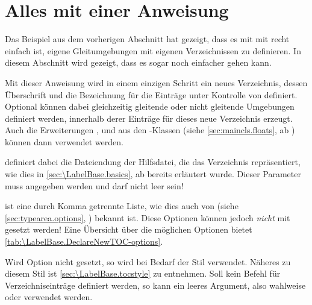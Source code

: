 \section{Alles mit einer Anweisung}

Das Beispiel aus dem vorherigen Abschnitt hat gezeigt, dass es mit mit
 recht einfach ist, eigene Gleitumgebungen mit eigenen
Verzeichnissen zu definieren. In diesem Abschnitt wird gezeigt, dass es sogar
noch einfacher gehen kann.

\begin{Declaration}
\end{Declaration}%
Mit dieser Anweisung wird in einem
einzigen Schritt ein neues Verzeichnis, dessen Überschrift und die Bezeichnung
für die Einträge unter Kontrolle von  definiert. Optional
können dabei gleichzeitig gleitende oder nicht gleitende Umgebungen definiert
werden, innerhalb derer %
 Einträge für
dieses neue Verzeichnis erzeugt. Auch die Erweiterungen
,  und
 aus den \KOMAScript-Klassen (siehe
\autoref{sec:maincls.floats}, ab )
können dann verwendet werden.

 definiert dabei die Dateiendung der Hilfsdatei, die
das Verzeichnis repräsentiert, wie dies in \autoref{sec:\LabelBase.basics}, ab
 bereits erläutert
wurde. Dieser Parameter muss angegeben werden und darf
nicht leer sein!

 ist eine durch Komma getrennte Liste, wie dies auch von
 (siehe \autoref{sec:typearea.options},
) bekannt ist. Diese
Optionen können jedoch \emph{nicht} mit
 gesetzt werden! Eine
Übersicht über die möglichen Optionen bietet
\autoref{tab:\LabelBase.DeclareNewTOC-options}.

Wird Option
 nicht gesetzt, so wird bei Bedarf der Stil
 verwendet. Näheres zu diesem Stil ist
\autoref{sec:\LabelBase.tocstyle} zu entnehmen. Soll kein Befehl für
Verzeichniseinträge definiert werden, so kann ein leeres Argument, also
wahlweise \iffree{}{\unskip} oder
 verwendet werden.

